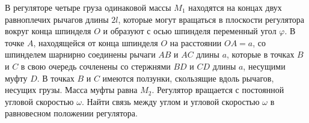 В регуляторе четыре груза одинаковой массы $M_1$ находятся на концах
двух равноплечих рычагов длины $2l$, которые могут вращаться
в плоскости регулятора вокруг конца шпинделя $O$ и образуют с осью
шпинделя переменный угол $\varphi$.
В точке $A$, находящейся от конца шпинделя $O$ на расстоянии $OA = a$,
со шпинделем шарнирно соединены рычаги $AB$ и $AC$ длины $a$,
которые в точках $B$ и $C$ в свою очередь сочленены со стержнями
$BD$ и $CD$ длины $a$, несущими муфту $D$.
В точках $B$ и $C$ имеются ползунки, скользящие вдоль рычагов, несущих грузы.
Масса муфты равна $M_2$.
Регулятор вращается с постоянной угловой скоростью $\omega$.
Найти связь между углом и угловой скоростью $\omega$
в равновесном положении регулятора.
